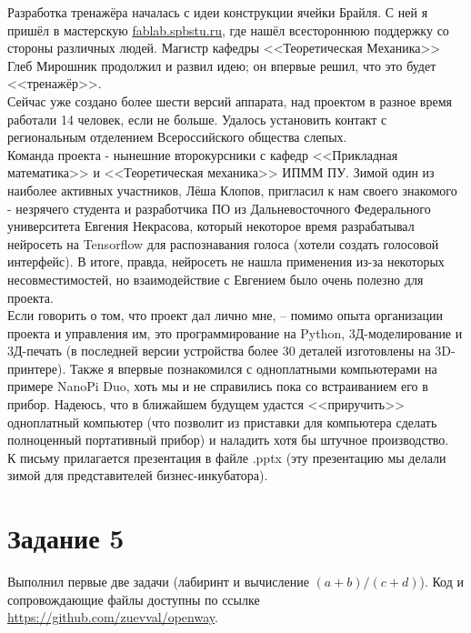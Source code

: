 \documentclass[a4paper,12pt]{article} %
\begin{document}
Разработка тренажёра началась с идеи конструкции ячейки Брайля. С ней я пришёл в мастерскую \href{ФабЛаб Политех}{fablab.spbstu.ru}, где нашёл всестороннюю поддержку со стороны различных людей. Магистр кафедры <<Теоретическая Механика>> Глеб Мирошник продолжил и развил идею; он впервые решил, что это будет <<тренажёр>>.\\
Сейчас уже создано более шести версий аппарата, над проектом в разное время работали 14 человек, если не больше. Удалось установить контакт с региональным отделением Всероссийского общества слепых.\\
Команда проекта - нынешние второкурсники с кафедр <<Прикладная математика>> и <<Теоретическая механика>> ИПММ ПУ. Зимой один из наиболее активных участников, Лёша Клопов, пригласил к нам своего знакомого - незрячего студента и разработчика ПО из Дальневосточного Федерального университета Евгения Некрасова, который некоторое время разрабатывал нейросеть на Tensorflow для распознавания голоса (хотели создать голосовой интерфейс). В итоге, правда, нейросеть не нашла применения из-за некоторых несовместимостей, но взаимодействие с Евгением было очень полезно для проекта.\\
Если говорить о том, что проект дал лично мне, -- помимо опыта организации проекта и управления им, это программирование на Python, 3Д-моделирование и 3Д-печать (в последней версии устройства более 30 деталей изготовлены на 3D-принтере). Также я впервые познакомился с одноплатными компьютерами на примере NanoPi Duo, хоть мы и не справились пока со встраиванием его в прибор. Надеюсь, что в ближайшем будущем удастся <<приручить>> одноплатный компьютер (что позволит из приставки для компьютера сделать полноценный портативный прибор) и наладить хотя бы штучное производство.\\
К письму прилагается презентация в файле .pptx (эту презентацию мы делали зимой для представителей бизнес-инкубатора).\\

\section{Задание 5}
Выполнил первые две задачи (лабиринт и вычисление $(a+b)/(c+d)$). Код и сопровождающие файлы доступны по ссылке \url{https://github.com/zuevval/openway}.


	
\end{document}

